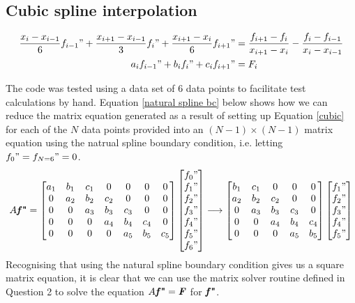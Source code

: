 \documentclass[paper=a4, fontsize=11pt]{scrartcl}
\begin{document}
\subsection{Cubic spline interpolation}

\begin{align}
\label{cubic}
	\begin{split}
	\frac{x_{i}-x_{i-1}}{6} f_{i-1}" + \frac{x_{i+1}-x_{i-1}}{3} f_{i}" + 	\frac{x_{i+1}-x_{i}}{6} f_{i+1}"  &= \frac{f_{i+1}-f_{i}}{ x_{i+1}-x_{i} } - \frac{f_{i}-f_{i-1}}{ x_{i}-x_{i-1} } \\
	a_{i} f_{i-1}" + b_{i} f_{i}" + c_{i} f_{i+1}" &= F_{i}
	\end{split}
\end{align}

The code was tested using a data set of $6$ data points to facilitate test calculations by hand. Equation \ref{natural  spline bc} below shows how we can reduce the matrix equation generated as a result of setting up Equation \ref{cubic} for each of the $N$ data points provided into an $(N-1) \times (N-1)$ matrix equation using the natrual spline boundary condition, i.e. letting $f_{0}" = f_{N=6}" = 0$. 
\begin{align}	
\label{natural spline bc}
A \textbf{\textit{f}"} =
\begin{bmatrix}
a_{1} & b_{1} & c_{1} & 0 & 0 & 0 & 0 \\
0 & a_{2} & b_{2} & c_{2} & 0 & 0 & 0\\
0 & 0 & a_{3} & b_{3} & c_{3} &0 & 0\\
0 & 0 & 0 & a_{4} & b_{4} & c_{4} & 0 \\
0 & 0 & 0 & 0 & a_{5} & b_{5} & c_{5}
\end{bmatrix}
\begin{bmatrix}
f_{0}" \\
f_{1}" \\
f_{2}" \\
f_{3}" \\
f_{4}" \\
f_{5}" \\
f_{6}"
\end{bmatrix}
\longrightarrow
\begin{bmatrix}
 b_{1} & c_{1} & 0 & 0 & 0 \\
 a_{2} & b_{2} & c_{2} & 0 & 0\\
 0 & a_{3} & b_{3} & c_{3} &0 \\
 0 & 0 & a_{4} & b_{4} & c_{4} \\
 0 & 0 & 0 & a_{5} & b_{5}
\end{bmatrix}
\begin{bmatrix}
f_{1}" \\
f_{2}" \\
f_{3}" \\
f_{4}" \\
f_{5}" 
\end{bmatrix}
\end{align}
Recognising that using the natural spline boundary condition gives us a square matrix equation, it is clear that we can use the matrix solver routine defined in Question 2 to solve the equation $A\textbf{\textit{f}"} = \textbf{\textit{F}}$ for $\textbf{\textit{f}"}$. 
\end{document}
